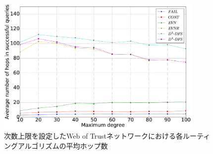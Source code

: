 \documentclass[dvipdfmx]{ampbt}
\begin{document}
   \begin{figure}[htbp]
    \centerline{\includegraphics[width=100mm]{../fig/clip_hops.eps}}
    \caption{次数上限を設定したWeb of Trustネットワークにおける各ルーティングアルゴリズムの平均ホップ数}
    \label{fig:clip_hops}
   \end{figure}
\end{document}
